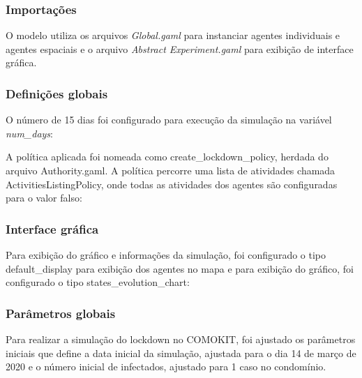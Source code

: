 
\subsubsection{Importações}

O modelo utiliza os arquivos \textit{Global.gaml }para instanciar agentes individuais e agentes espaciais e o arquivo \textit{Abstract Experiment.gaml } para exibição de interface gráfica.

\subsubsection{Definições globais}

O número de 15 dias foi configurado para execução da simulação na variável \textit{num\_days}:


A política aplicada foi nomeada como create\_lockdown\_policy, herdada do arquivo Authority.gaml. A política percorre uma lista de atividades chamada ActivitiesListingPolicy, onde todas as atividades dos agentes são configuradas para o valor falso:


\subsubsection{Interface gráfica}

Para exibição do gráfico e informações da simulação, foi configurado o tipo default\_display para exibição dos agentes no mapa e para exibição do gráfico, foi configurado o tipo states\_evolution\_chart:



\subsubsection{Parâmetros globais}

Para realizar a simulação do lockdown no COMOKIT, foi ajustado os parâmetros iniciais que define a data inicial da simulação, ajustada para o dia 14 de março de 2020 e o número inicial de infectados, ajustado para 1 caso no condomínio.

